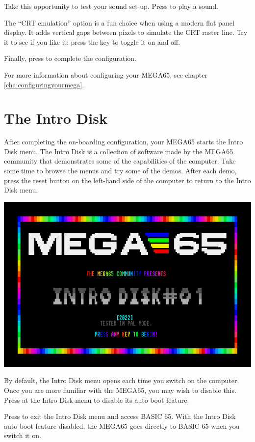 Take this opportunity to test your sound set-up. Press  to play a sound.

The ``CRT emulation'' option is a fun choice when using a modern flat panel display. It adds vertical gaps between pixels to simulate the CRT raster line. Try it to see if you like it: press the  key to toggle it on and off.

Finally, press  to complete the configuration.

For more information about configuring your MEGA65, see chapter \vref{cha:configuringyourmega}.

\section{The Intro Disk}

After completing the on-boarding configuration, your MEGA65 starts the Intro Disk menu. The Intro Disk is a collection of software made by the MEGA65 community that demonstrates some of the capabilities of the computer. Take some time to browse the menus and try some of the demos. After each demo, press the reset button on the left-hand side of the computer to return to the Intro Disk menu.

\begin{center}
  \includegraphics[width=0.7\linewidth]{images/demo_title.png}
\end{center}

By default, the Intro Disk menu opens each time you switch on the computer. Once you are more familiar with the MEGA65, you may wish to disable this. Press  at the Intro Disk menu to disable its auto-boot feature.

Press  to exit the Intro Disk menu and access BASIC 65. With the Intro Disk auto-boot feature disabled, the MEGA65 goes directly to BASIC 65 when you switch it on.

